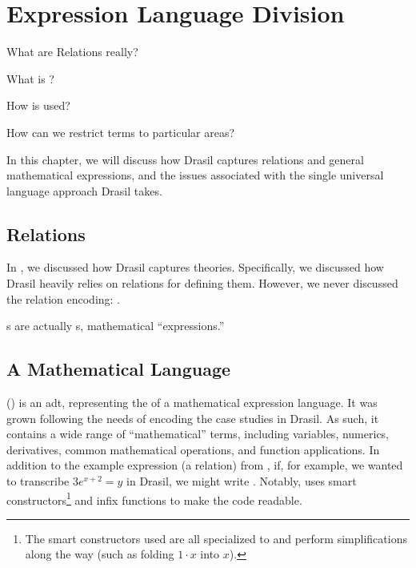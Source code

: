 \chapter{Expression Language Division}
\label{chap:lang-division}

\begin{writingdirectives}
    \item What are Relations really?
    \item What is \Expr{}?
    \item How is \Expr{} used?
    \item How can we restrict \Expr{} terms to particular areas?
\end{writingdirectives}

In this chapter, we will discuss how Drasil captures relations and general
mathematical expressions, and the issues associated with the single universal
language approach Drasil takes.

\section{Relations}
\label{chap:lang-division:sec:relations}

In , we discussed how Drasil captures theories.
Specifically, we discussed how Drasil heavily relies on relations for defining
them. However, we never discussed the relation encoding: \Relation{}.

\originalRelation{}

\Relation{}s are actually \Expr{}s, mathematical ``expressions.''

\originalExprHaskell{}

\section{A Mathematical Language}
\label{chap:lang-division:sec:a-mathematical-language}

\Expr{} () is an \acs{adt}, representing the 
of a mathematical expression language. It was grown following the needs of
encoding the case studies in Drasil. As such, it contains a wide range of
``mathematical'' terms, including variables, numerics, derivatives, common
mathematical operations, and function applications. In addition to the example
expression (a relation) from , if, for
example, we wanted to transcribe \(3 e^{x + 2} = y\) in Drasil, we might write
. Notably,  uses smart
constructors\footnote{The smart constructors used are all specialized to \Expr{}
and perform simplifications along the way (such as folding \(1 \cdot x\) into
\(x\)).} and infix functions to make the code readable. 

